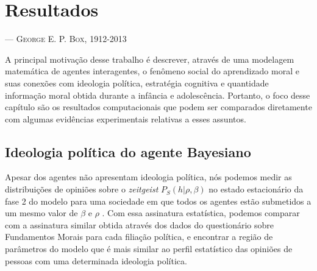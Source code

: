 \chapter{Resultados} %
\label{chap:resultados}

\begin{epigraphs}
{\---- \textsc{George E. P. Box, 1912-2013}}
\end{epigraphs}

A principal motivação desse trabalho é descrever, através de uma modelagem
matemática de agentes interagentes, o fenômeno social do aprendizado moral
e suas conexões com ideologia política, estratégia cognitiva e quantidade
informação moral obtida durante a infância e adolescência. Portanto, o
foco desse capítulo são os resultados computacionais que podem ser comparados
diretamente com algumas evidências experimentais relativas a esses assuntos.


\section{Ideologia política do agente Bayesiano} %

Apesar dos agentes não apresentam ideologia política, nós podemos medir as
distribuições de opiniões sobre o \textit{zeitgeist} $P_S(h|\rho,\beta)$
no estado estacionário da fase 2 do modelo para uma sociedade em que todos
os agentes estão submetidos a um mesmo valor de $\beta$ e $\rho$ . Com
essa assinatura estatística, podemos comparar com a assinatura similar
obtida através dos dados do questionário sobre Fundamentos Morais para
cada filiação política, e encontrar a região de parâmetros do modelo que é mais
similar ao perfil estatístico das opiniões de pessoas com uma determinada
ideologia política.

